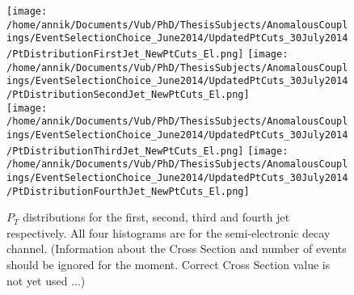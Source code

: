 \begin{figure}[!h]
\texttt{[image: /home/annik/Documents/Vub/PhD/ThesisSubjects/AnomalousCouplings/EventSelectionChoice\_June2014/UpdatedPtCuts\_30July2014/PtDistributionFirstJet\_NewPtCuts\_El.png]}
\texttt{[image: /home/annik/Documents/Vub/PhD/ThesisSubjects/AnomalousCouplings/EventSelectionChoice\_June2014/UpdatedPtCuts\_30July2014/PtDistributionSecondJet\_NewPtCuts\_El.png]}\\
\texttt{[image: /home/annik/Documents/Vub/PhD/ThesisSubjects/AnomalousCouplings/EventSelectionChoice\_June2014/UpdatedPtCuts\_30July2014/PtDistributionThirdJet\_NewPtCuts\_El.png]}
\texttt{[image: /home/annik/Documents/Vub/PhD/ThesisSubjects/AnomalousCouplings/EventSelectionChoice\_June2014/UpdatedPtCuts\_30July2014/PtDistributionFourthJet\_NewPtCuts\_El.png]}
\caption{$P_T$ distributions for the first, second, third and fourth jet respectively. All four histograms are for the semi-electronic decay channel. (Information about the Cross Section and number of events should be ignored for the moment. Correct Cross Section value is not yet used ...) }
\end{figure}

